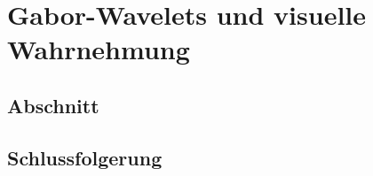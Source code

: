 %
%
%
\chapter{Gabor-Wavelets und visuelle Wahrnehmung\label{chapter:visuell}}
\begin{refsection}

\section{Abschnitt}

\section{Schlussfolgerung}

\printbibliography[heading=subbibliography]
\end{refsection}
